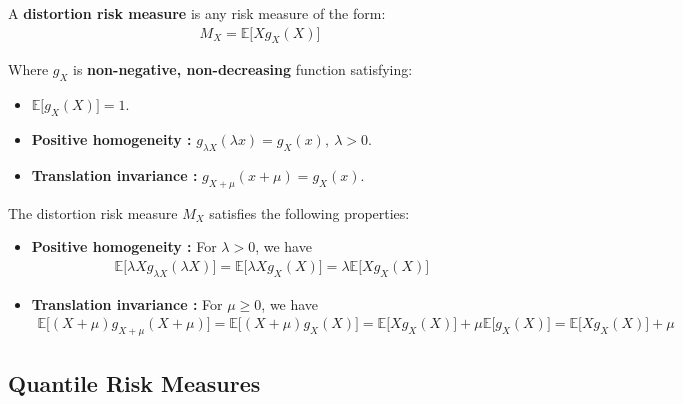 \begin{definition}
    A \textbf{distortion risk measure} is any risk measure of the form:
    \begin{align*}
        M_X = \mathbb{E}\Big[ Xg_X(X) \Big]
    \end{align*}

    \noindent Where $g_X$ is \textbf{non-negative, non-decreasing} function satisfying:
    \begin{itemize}
        \item $\mathbb{E}\Big[ g_X(X) \Big] = 1$.
        \item \textbf{Positive homogeneity : } $g_{\lambda X}(\lambda x) = g_X(x), \ \lambda > 0$.
        \item \textbf{Translation invariance : } $g_{X + \mu}(x+\mu) = g_X(x)$.
    \end{itemize}

    \noindent\newline The distortion risk measure $M_X$ satisfies the following properties:
    \begin{itemize}
        \item \textbf{Positive homogeneity : } For $\lambda > 0$, we have
        \begin{align*}
            \mathbb{E}\Big[ \lambda X g_{\lambda X}(\lambda X)\Big] = \mathbb{E}\Big[ \lambda X g_{X}(X)\Big] = \lambda \mathbb{E}\Big[ Xg_X(X) \Big]
        \end{align*}

        \item \textbf{Translation invariance : } For $\mu \ge 0$, we have
        \begin{align*}
            \mathbb{E}\Big[ (X + \mu)g_{X+\mu}(X+\mu) \Big] = \mathbb{E}\Big[ (X + \mu)g_{X}(X) \Big] = \mathbb{E}\Big[ Xg_X(X) \Big] + \mu\mathbb{E}\Big[ g_{X}(X) \Big] = \mathbb{E}\Big[ Xg_X(X) \Big] + \mu
        \end{align*}
    \end{itemize}
\end{definition}

\subsection{Quantile Risk Measures}
